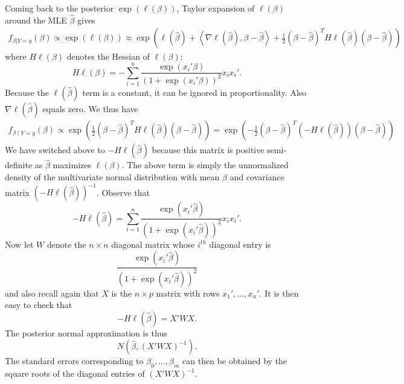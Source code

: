 \documentclass{scrartcl}
\begin{document}
   Coming back to the posterior $\exp(\ell(\beta))$, Taylor expansion of
   $\ell(\beta)$ around the MLE $\hat{\beta}$ gives
   \begin{align*}
     f_{\beta | Y = y}(\beta) \propto \exp(\ell(\beta)) \approx \exp
     \left(\ell(\hat{\beta}) + \left<\nabla \ell(\hat{\beta}), \beta -
     \hat{\beta}\right> + \frac{1}{2} (\beta - \hat{\beta})^T
     H\ell(\hat{\beta}) (\beta - \hat{\beta}) \right)
   \end{align*}
   where $H\ell(\beta)$ denotes the Hessian of $\ell(\beta)$: 
  \begin{equation*}
    H \ell(\beta) = - \sum_{i=1}^n \frac{\exp(x_i' \beta)}{\left(1 +
      \exp(x_i' \beta)\right)^2} x_i x_i'. 
\end{equation*}
 Because the $\ell(\hat \beta)$ term is a constant, it can be ignored
 in proportionality. Also $\nabla \ell(\hat{\beta})$ equals zero. We
 thus have
 \begin{align*}
   f_{\beta \mid Y = y} (\beta) \propto \exp
     \left(\frac{1}{2} (\beta - \hat{\beta})^T
     H\ell(\hat{\beta}) (\beta - \hat{\beta}) \right) = \exp
     \left(-\frac{1}{2} (\beta - \hat{\beta})^T
     \left(-H\ell(\hat{\beta}) \right) (\beta - \hat{\beta}) \right) 
 \end{align*}
We have switched above to $-H\ell(\hat{\beta})$ because this matrix is
positive semi-definite as $\hat{\beta}$ maximizes $\ell(\beta)$. The
above term is simply the unnormalized density of the multivariate
normal distribution with mean $\hat{\beta}$ and covariance matrix $(-H
\ell(\hat{\beta}))^{-1}$. Observe that 
\begin{equation*}
 - H \ell(\hat \beta) =  \sum_{i=1}^n \frac{\exp(x_i' \hat{\beta})}{\left(1 +
      \exp(x_i' \hat{\beta})\right)^2} x_i x_i'. 
\end{equation*}
Now let $W$ denote the $n \times n$ diagonal matrix whose
$i^{th}$ diagonal entry is
\begin{equation*}
  \frac{\exp(x_i' \hat{\beta})}{\left(1 +
      \exp(x_i' \hat{\beta})\right)^2}
\end{equation*}
and also recall again that $X$ is the $n \times p$ matrix with rows
$x_1', \dots, x_n'$. It is then easy to check that
\begin{equation}\label{hess1}
-  H \ell(\hat \beta) = X' W X. 
\end{equation}
The posterior normal approximation is thus
\begin{equation}\label{blogna}
  N(\hat{\beta}, (X' W X)^{-1}). 
\end{equation}
The standard errors corresponding to $\beta_0, \dots, \beta_m$ can
then be obtained by the square roots of the diagonal entries of $(X' W
X)^{-1}$. 
\end{document}
